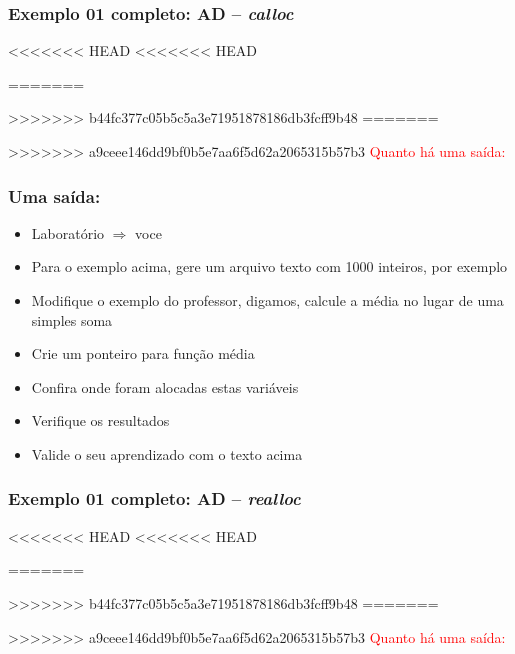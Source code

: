 \begin{frame}[allowframebreaks=0.9, c]

\frametitle{Exemplo 01 completo: AD -- \textit{calloc}}

<<<<<<< HEAD
<<<<<<< HEAD

=======

>>>>>>> b44fc377c05b5c5a3e71951878186db3fcff9b48
=======

>>>>>>> a9ceee146dd9bf0b5e7aa6f5d62a2065315b57b3
\pause
\textcolor{red}{Quanto há uma saída:}
\end{frame}

\begin{frame}[fragile, c]

\frametitle{Uma saída:}
\begin{block}{}
\begin{itemize}
  \item Laboratório $\Rightarrow $ voce
  \item Para o exemplo acima, gere um arquivo texto com 1000 inteiros, por exemplo
  \item Modifique o exemplo do professor, digamos, calcule
  a média no lugar de uma simples soma
  \item Crie um ponteiro para  função média 
    \item Confira onde foram alocadas estas variáveis
  \item Verifique os resultados
  \item Valide o seu aprendizado com o texto acima 

\end{itemize}
\end{block}
\end{frame}


\begin{frame}[allowframebreaks=0.9, c]

\frametitle{Exemplo 01 completo: AD -- \textit{realloc}}

<<<<<<< HEAD
<<<<<<< HEAD

=======

>>>>>>> b44fc377c05b5c5a3e71951878186db3fcff9b48
=======

>>>>>>> a9ceee146dd9bf0b5e7aa6f5d62a2065315b57b3
\pause
\textcolor{red}{Quanto há uma saída:}
\end{frame}

